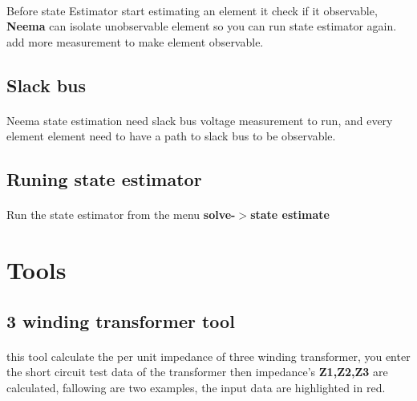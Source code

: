 \documentclass{article}
\begin{document}
\paragraph{}Before state Estimator start estimating an element it check if it observable, \textbf{Neema} can isolate unobservable element so you can run state estimator again. add more measurement to make element observable.
\subsection{Slack bus}
\paragraph{} Neema state estimation need slack bus voltage measurement to run, and every element element  need to have a path to slack bus to be observable.
\subsection{Runing state estimator}
\paragraph{} Run the state estimator from the menu \textbf{solve-$>$state estimate} 
\newpage
\section{Tools}
\subsection{3 winding transformer tool}
\label{sec:T3wtool}
\paragraph{} this tool calculate the per unit impedance of three winding transformer, you enter the short circuit test data of the transformer then impedance's \textbf{Z1,Z2,Z3} are calculated, fallowing are two examples, the input data are highlighted in red.
\end{document}
